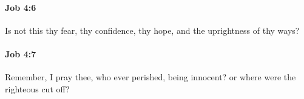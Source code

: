 		\paragraph{Job 4:6} %
			\label{JOB-4-6}

			Is not this thy fear, thy confidence, thy hope, and the uprightness of thy ways?


		\paragraph{Job 4:7} %
			\label{JOB-4-7}

			Remember, I pray thee, who ever perished, being innocent? or where were the righteous cut off?


